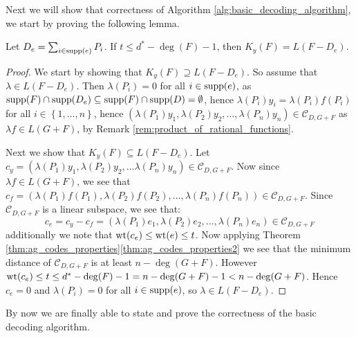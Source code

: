 Next we will show that correctness of Algorithm \ref{alg:basic_decoding_algorithm}, we start by proving the following lemma.
\begin{lemma}\label{lem:Ky_equals_L}
  Let $D_e = \sum_{i \in \textnormal{supp}(e)} P_{i}$. If $t \leq d^{*} - \deg(F) - 1$, then $K_y(F) = L(F - D_{e})$.
\end{lemma}
\begin{proof}
  We start by showing that $K_y(F) \supseteq L(F - D_{e})$. So assume that $\lambda \in L(F - D_e)$. Then $\lambda(P_i) = 0$ for all $i \in \textnormal{supp}(e)$, as $\textnormal{supp}(F) \cap \textnormal{supp}(D_e) \subseteq \textnormal{supp}(F) \cap \textnormal{supp}(D) = \emptyset$, hence $\lambda(P_{i})y_{i} = \lambda(P_i)f(P_i)$ for all $i \in \left\{1, \ldots, n\right\}$, hence $(\lambda(P_1)y_1, \lambda(P_2)y_2, \ldots, \lambda(P_n)y_n) \in \mathcal{C}_{D, G + F}$ as $\lambda f \in L(G + F)$, by Remark \ref{rem:product_of_rational_functions}.

  Next we show that $K_y(F) \subseteq L(F - D_e)$. Let $c_{y} = (\lambda(P_1)y_1, \lambda(P_2)y_2, \ldots \lambda(P_{n})y_n) \in \mathcal{C}_{D, G + F}$. Now since $\lambda f \in L(G + F)$, we see that $c_f = (\lambda(P_1)f(P_{1}), \lambda(P_2)f(P_2), \ldots, \lambda(P_n)f(P_n)) \in \mathcal{C}_{D, G + F}$. Since $\mathcal{C}_{D, G + F}$ is a linear subspace, we see that:
  \begin{equation*}
   c_e = c_{y} - c_{f} = (\lambda(P_{1})e_{1}, \lambda(P_{2})e_{2}, \ldots, \lambda(P_{n})e_{n}) \in \mathcal{C}_{D, G + F}
  \end{equation*}
   additionally we note that $\mathrm{wt}(c_e) \leq \mathrm{wt}(e) \leq t$. Now applying Theorem \ref{thm:ag_codes_properties}\ref{thm:ag_codes_properties2} we see that the minimum distance of $\mathcal{C}_{D, G + F}$ is at least $n - \deg(G + F)$. However $\mathrm{wt}(c_{e}) \leq t \leq d^{*} - \deg(F) - 1 = n - \deg(G + F) - 1 < n - \deg(G + F)$. Hence $c_e = 0$ and $\lambda(P_i) = 0$ for all $i \in \textnormal{supp}(e)$, so $\lambda \in L(F - D_{e})$.
\end{proof}

By now we are finally able to state and prove the correctness of the basic decoding algorithm.

